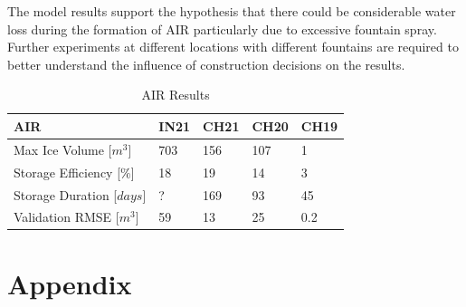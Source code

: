 \documentclass[utf8]{frontiersSCNS} %
\begin{document}

The model results support the hypothesis that there could be considerable water loss during the formation of AIR
particularly due to excessive fountain spray. Further experiments at different locations with different fountains are
required to better understand the influence of construction decisions on the results. 

\begin{table}
\centering
\caption{AIR Results}
\label{tab:results}
\begin{tabular}{@{}|l|l|l|l|l|@{}}
\toprule
\textbf{AIR}   & \textbf{IN21} & \textbf{CH21} & \textbf{CH20} & \textbf{CH19} \\ \midrule
Max Ice Volume [$m^3$] & 703             & 156             & 107             & 1             \\ \midrule
Storage Efficiency [$\%$] & 18             & 19             & 14             & 3             \\ \midrule
Storage Duration [$days$] & ?             & 169             & 93             & 45             \\ \bottomrule
Validation RMSE [$m^3$] & 59             & 13             & 25             & 0.2             \\ \bottomrule
\end{tabular}
\end{table}


\section{Appendix}
\end{document}
